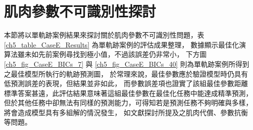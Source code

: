 \section{肌肉參數不可識別性探討}
本節將以單軌跡案例結果來探討關於肌肉參數不可識別性問題，表 \ref{ch5_table_CaseE_Results} 為單軌跡案例的評估成果整理，
數據顯示最佳化演算法雖未如先前案例尋找到極小值，不過該誤差仍非常小，
下方圖 \ref{ch5_fig_CaseE_BICs_7} 與 \ref{ch5_fig_CaseE_BICs_40} 則為單軌跡案例所得到之最佳模型所執行的軌跡預測圖，
於常理來說，最佳參數應於驗證模型時仍具有低預測誤差的表現，但結果並非如此，
而參數誤差項也證實了該組最佳參數距離標準答案甚遠，此評估結果意味著這組最佳參數在最佳化任務中能達成精準預測，
但於其他任務中卻無法有同樣的預測能力，可得知若是預測任務不夠明確與多樣，將會造成模型具有多組解的情況發生，
如文獻探討所提及之肌肉代償、參數抗衡等問題。

\begin{table}[!ht]
    \caption[單軌跡案例之肌肉參數評估成果整理]{單軌跡案例之肌肉參數評估成果整理}
	\label{ch5_table_CaseE_Results}
	\centering
\end{table}

